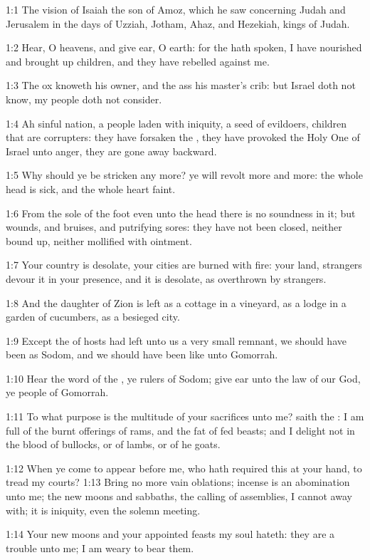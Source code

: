 

1:1 The vision of Isaiah the son of Amoz, which he saw concerning
Judah and Jerusalem in the days of Uzziah, Jotham, Ahaz, and Hezekiah,
kings of Judah.

1:2 Hear, O heavens, and give ear, O earth: for the \LORD hath spoken,
I have nourished and brought up children, and they have rebelled
against me.

1:3 The ox knoweth his owner, and the ass his master's crib: but
Israel doth not know, my people doth not consider.

1:4 Ah sinful nation, a people laden with iniquity, a seed of
evildoers, children that are corrupters: they have forsaken the \LORD,
they have provoked the Holy One of Israel unto anger, they are gone
away backward.

1:5 Why should ye be stricken any more? ye will revolt more and more:
the whole head is sick, and the whole heart faint.

1:6 From the sole of the foot even unto the head there is no soundness
in it; but wounds, and bruises, and putrifying sores: they have not
been closed, neither bound up, neither mollified with ointment.

1:7 Your country is desolate, your cities are burned with fire: your
land, strangers devour it in your presence, and it is desolate, as
overthrown by strangers.

1:8 And the daughter of Zion is left as a cottage in a vineyard, as a
lodge in a garden of cucumbers, as a besieged city.

1:9 Except the \LORD of hosts had left unto us a very small remnant, we
should have been as Sodom, and we should have been like unto Gomorrah.

1:10 Hear the word of the \LORD, ye rulers of Sodom; give ear unto the
law of our God, ye people of Gomorrah.

1:11 To what purpose is the multitude of your sacrifices unto me?
saith the \LORD: I am full of the burnt offerings of rams, and the fat
of fed beasts; and I delight not in the blood of bullocks, or of
lambs, or of he goats.

1:12 When ye come to appear before me, who hath required this at your
hand, to tread my courts?  1:13 Bring no more vain oblations; incense
is an abomination unto me; the new moons and sabbaths, the calling of
assemblies, I cannot away with; it is iniquity, even the solemn
meeting.

1:14 Your new moons and your appointed feasts my soul hateth: they are
a trouble unto me; I am weary to bear them.

